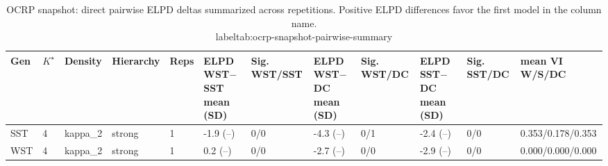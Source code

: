 \begin{table}[!h]
\centering
\caption{OCRP snapshot: direct pairwise ELPD deltas summarized across repetitions. Positive ELPD differences favor the first model in the column name.\\label{tab:ocrp-snapshot-pairwise-summary}}
\centering
\begin{tabular}[t]{llllllllllll}
\toprule
Gen & $K^\star$ & Density & Hierarchy & Reps & ELPD WST$-$SST mean (SD) & Sig. WST/SST & ELPD WST$-$DC mean (SD) & Sig. WST/DC & ELPD SST$-$DC mean (SD) & Sig. SST/DC & mean VI W/S/DC\\
\midrule
SST & 4 & kappa_2 & strong & 1 & -1.9 (--) & 0/0 & -4.3 (--) & 0/1 & -2.4 (--) & 0/0 & 0.353/0.178/0.353\\
WST & 4 & kappa_2 & strong & 1 & 0.2 (--) & 0/0 & -2.7 (--) & 0/0 & -2.9 (--) & 0/0 & 0.000/0.000/0.000\\
\bottomrule
\end{tabular}
\end{table}
